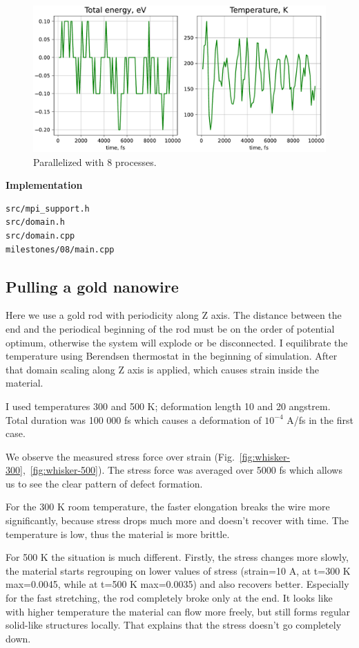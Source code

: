 \documentclass[12pt,a4paper]{article}
\begin{document}
\begin{figure}[h!]
	\centering
	\includegraphics[width=.85\linewidth]{img/milestone08-8proc.pdf}
	\caption{Parallelized with 8 processes.}
	\label{fig:parallel-3}
\end{figure}

{\bf Implementation}
\begin{lstlisting}[breaklines]
src/mpi_support.h
src/domain.h
src/domain.cpp
milestones/08/main.cpp
\end{lstlisting}

\clearpage %

\subsection*{Pulling a gold nanowire}

Here we use a gold rod with periodicity along Z axis. The distance between the end and the periodical beginning of the rod must be on the order of potential optimum, otherwise the system will explode or be disconnected. I equilibrate the temperature using Berendsen thermostat in the beginning of simulation. After that domain scaling along Z axis is applied, which causes strain inside the material.

I used temperatures 300 and 500 K; deformation length 10 and 20 angstrem. Total duration was 100 000 fs which causes a deformation of $10^{-4}$ A/fs in the first case.

We observe the measured stress force over strain (Fig.~\ref{fig:whisker-300},~\ref{fig:whisker-500}). The stress force was averaged over 5000 fs which allows us to see the clear pattern of defect formation.

For the 300 K room temperature, the faster elongation breaks the wire more significantly, because stress drops much more and doesn't recover with time. The temperature is low, thus the material is more brittle.

For 500 K the situation is much different. Firstly, the stress changes more slowly, the material starts regrouping on lower values of stress (strain=10 A, at t=300 K max=0.0045, while at t=500 K max=0.0035) and also recovers better. Especially for the fast stretching, the rod completely broke only at the end. It looks like with higher temperature the material can flow more freely, but still forms regular solid-like structures locally. That explains that the stress doesn't go completely down.
\end{document}
